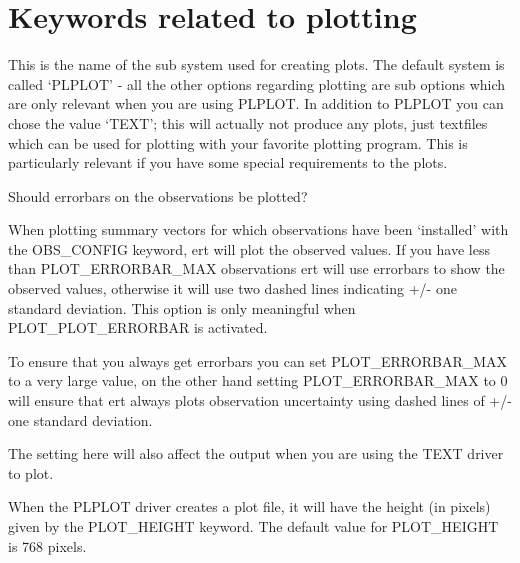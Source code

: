 \documentclass[letterpaper,10pt,english]{sphinxmanual}
\begin{document}
\section{Keywords related to plotting}
\label{\detokenize{keywords/index:keywords-related-to-plotting}}\label{\detokenize{keywords/index:id16}}\label{\detokenize{keywords/index:plot-driver}}
\begin{sphinxShadowBox}

This is the name of the sub system used for creating plots. The default system
is called ‘PLPLOT’ - all the other options regarding plotting are sub options
which are only relevant when you are using PLPLOT. In addition to PLPLOT you
can chose the value ‘TEXT’; this will actually not produce any plots, just
textfiles which can be used for plotting with your favorite plotting program.
This is particularly relevant if you have some special requirements to the
plots.
\end{sphinxShadowBox}
\label{\detokenize{keywords/index:plot-errorbar}}
\begin{sphinxShadowBox}

Should errorbars on the observations be plotted?
\end{sphinxShadowBox}
\label{\detokenize{keywords/index:plot-errorbar-max}}
\begin{sphinxShadowBox}

When plotting summary vectors for which observations have been ‘installed’
with the OBS\_CONFIG keyword, ert will plot the observed values. If you have
less than PLOT\_ERRORBAR\_MAX observations ert will use errorbars to show the
observed values, otherwise it will use two dashed lines indicating +/- one
standard deviation. This option is only meaningful when PLOT\_PLOT\_ERRORBAR is
activated.

To ensure that you always get errorbars you can set PLOT\_ERRORBAR\_MAX to a
very large value, on the other hand setting PLOT\_ERRORBAR\_MAX to 0 will ensure
that ert always plots observation uncertainty using dashed lines of +/- one
standard deviation.

The setting here will also affect the output when you are using the TEXT
driver to plot.
\end{sphinxShadowBox}
\label{\detokenize{keywords/index:plot-height}}
\begin{sphinxShadowBox}

When the PLPLOT driver creates a plot file, it will have the height (in
pixels) given by the PLOT\_HEIGHT keyword. The default value for PLOT\_HEIGHT is
768 pixels.
\end{sphinxShadowBox}
\end{document}
